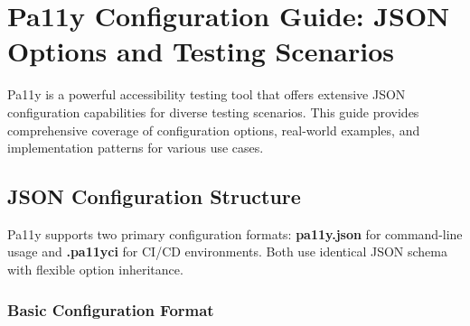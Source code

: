 \section{Pa11y Configuration Guide: JSON Options and Testing
Scenarios}\label{pa11y-configuration-guide-json-options-and-testing-scenarios}

Pa11y is a powerful accessibility testing tool that offers extensive
JSON configuration capabilities for diverse testing scenarios. This
guide provides comprehensive coverage of configuration options,
real-world examples, and implementation patterns for various use cases.

\subsection{JSON Configuration
Structure}\label{json-configuration-structure}

Pa11y supports two primary configuration formats: \textbf{pa11y.json}
for command-line usage and \textbf{.pa11yci} for CI/CD environments.
Both use identical JSON schema with flexible option inheritance.

\subsubsection{Basic Configuration
Format}\label{basic-configuration-format}

\begin{Shaded}
\begin{Highlighting}[]
\FunctionTok{\{}
  \FunctionTok{:} \FunctionTok{\{}
    \FunctionTok{:} \FunctionTok{,}
    \FunctionTok{:} \FunctionTok{,}
    \FunctionTok{:} \FunctionTok{\{}
      \FunctionTok{:} \FunctionTok{,}
      \FunctionTok{:} 
    \FunctionTok{\},}
    \FunctionTok{:} \OtherTok{[}\OtherTok{,} \OtherTok{]}
  \FunctionTok{\},}
  \FunctionTok{:} \OtherTok{[}
    \OtherTok{,}
    \FunctionTok{\{}
      \FunctionTok{:} \FunctionTok{,}
      \FunctionTok{:} \FunctionTok{,}
      \FunctionTok{:} \OtherTok{[}\OtherTok{]}
    \FunctionTok{\}}
  \OtherTok{]}
\FunctionTok{\}}
\end{Highlighting}
\end{Shaded}

